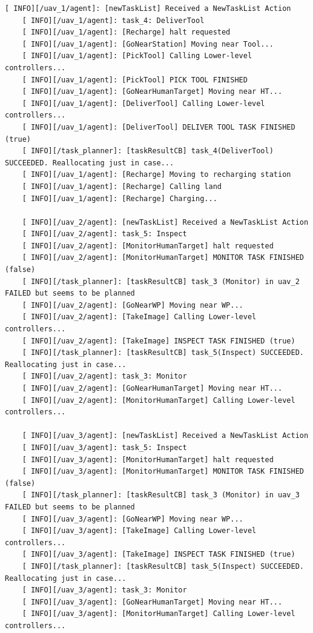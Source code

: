 \begin{lstlisting}[caption={Feedback messages printed by the \emph{Agent Behaviour Manager} during the new plan execution}, breaklines=true, label=exit:NewPlanAgentFeedback]
    [ INFO][/uav_1/agent]: [newTaskList] Received a NewTaskList Action
    [ INFO][/uav_1/agent]: task_4: DeliverTool
    [ INFO][/uav_1/agent]: [Recharge] halt requested
    [ INFO][/uav_1/agent]: [GoNearStation] Moving near Tool...
    [ INFO][/uav_1/agent]: [PickTool] Calling Lower-level controllers...
    [ INFO][/uav_1/agent]: [PickTool] PICK TOOL FINISHED
    [ INFO][/uav_1/agent]: [GoNearHumanTarget] Moving near HT...
    [ INFO][/uav_1/agent]: [DeliverTool] Calling Lower-level controllers...
    [ INFO][/uav_1/agent]: [DeliverTool] DELIVER TOOL TASK FINISHED (true)
    [ INFO][/task_planner]: [taskResultCB] task_4(DeliverTool) SUCCEEDED. Reallocating just in case...
    [ INFO][/uav_1/agent]: [Recharge] Moving to recharging station
    [ INFO][/uav_1/agent]: [Recharge] Calling land
    [ INFO][/uav_1/agent]: [Recharge] Charging...
    
    [ INFO][/uav_2/agent]: [newTaskList] Received a NewTaskList Action
    [ INFO][/uav_2/agent]: task_5: Inspect
    [ INFO][/uav_2/agent]: [MonitorHumanTarget] halt requested
    [ INFO][/uav_2/agent]: [MonitorHumanTarget] MONITOR TASK FINISHED (false)
    [ INFO][/task_planner]: [taskResultCB] task_3 (Monitor) in uav_2 FAILED but seems to be planned
    [ INFO][/uav_2/agent]: [GoNearWP] Moving near WP...
    [ INFO][/uav_2/agent]: [TakeImage] Calling Lower-level controllers...
    [ INFO][/uav_2/agent]: [TakeImage] INSPECT TASK FINISHED (true)
    [ INFO][/task_planner]: [taskResultCB] task_5(Inspect) SUCCEEDED. Reallocating just in case...
    [ INFO][/uav_2/agent]: task_3: Monitor
    [ INFO][/uav_2/agent]: [GoNearHumanTarget] Moving near HT...
    [ INFO][/uav_2/agent]: [MonitorHumanTarget] Calling Lower-level controllers...
    
    [ INFO][/uav_3/agent]: [newTaskList] Received a NewTaskList Action
    [ INFO][/uav_3/agent]: task_5: Inspect
    [ INFO][/uav_3/agent]: [MonitorHumanTarget] halt requested
    [ INFO][/uav_3/agent]: [MonitorHumanTarget] MONITOR TASK FINISHED (false)
    [ INFO][/task_planner]: [taskResultCB] task_3 (Monitor) in uav_3 FAILED but seems to be planned
    [ INFO][/uav_3/agent]: [GoNearWP] Moving near WP...
    [ INFO][/uav_3/agent]: [TakeImage] Calling Lower-level controllers...
    [ INFO][/uav_3/agent]: [TakeImage] INSPECT TASK FINISHED (true)
    [ INFO][/task_planner]: [taskResultCB] task_5(Inspect) SUCCEEDED. Reallocating just in case...
    [ INFO][/uav_3/agent]: task_3: Monitor
    [ INFO][/uav_3/agent]: [GoNearHumanTarget] Moving near HT...
    [ INFO][/uav_3/agent]: [MonitorHumanTarget] Calling Lower-level controllers...
\end{lstlisting}


